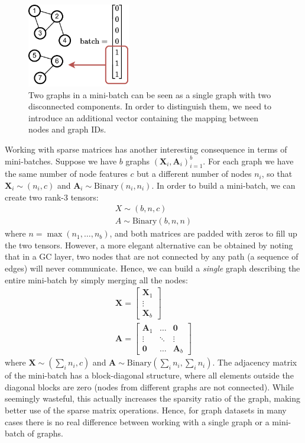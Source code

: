 \begin{figure}
    \centering
    \hspace{2em}\includegraphics[width=0.4\textwidth]{images/graphs-Page-4}
    \caption{Two graphs in a mini-batch can be seen as a single graph with two disconnected components. In order to distinguish them, we need to introduce an additional vector containing the mapping between nodes and graph IDs.}
    \label{fig:graph_batch}
\end{figure}

Working with sparse matrices has another interesting consequence in terms of mini-batches. Suppose we have $b$ graphs $(\mathbf{X}_i, \mathbf{A}_i)_{i=1}^b$. For each graph we have the same number of node features $c$ but a different number of nodes $n_i$, so that $\mathbf{X}_i \sim (n_i, c)$ and $\mathbf{A}_i \sim \text{Binary}(n_i, n_i)$. In order to build a mini-batch, we can create two rank-$3$ tensors:
%
\begin{gather}
X \sim (b,n,c) \\A\sim \text{Binary}(b,n,n)
\end{gather}
%
where $n = \max(n_1, \ldots, n_b)$, and both matrices are padded with zeros to fill up the two tensors. However, a more elegant alternative can be obtained by noting that in a GC layer, two nodes that are not connected by any path (a sequence of edges) will never communicate. Hence, we can build a \textit{single} graph describing the entire mini-batch by simply merging all the nodes:
%
\begin{gather}
\mathbf{X} = \begin{bmatrix}\mathbf{X}_1 \\ \vdots \\ \mathbf{X}_b \end{bmatrix} \\ \mathbf{A} = \begin{bmatrix} \mathbf{A}_1 & \ldots & \mathbf{0} \\ \vdots& \ddots & \vdots \\ \mathbf{0} & \ldots & \mathbf{A}_b \end{bmatrix}
\end{gather}
%
where $\mathbf{X} \sim (\sum_i n_i, c)$ and $\mathbf{A} \sim \text{Binary}(\sum_i n_i, \sum_i n_i)$. The adjacency matrix of the mini-batch has a block-diagonal structure, where all elements outside the diagonal blocks are zero (nodes from different graphs are not connected). While seemingly wasteful, this actually increases the sparsity ratio of the graph, making better use of the sparse matrix operations. Hence, for graph datasets in many cases there is no real difference between working with a single graph or a mini-batch of graphs.

